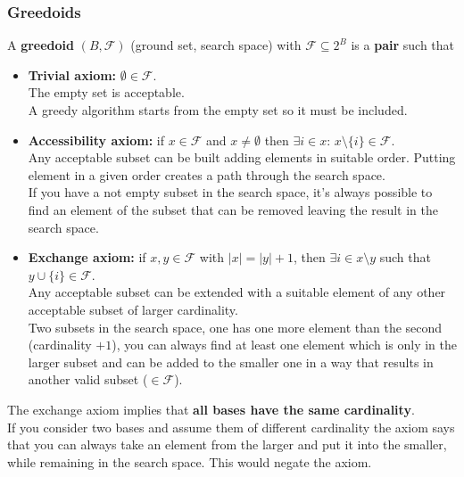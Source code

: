 \subsubsection{Greedoids}
A \textbf{greedoid} $(B, \mathcal{F})$ (ground set, search space) with $\mathcal{F} \subseteq 2^B$ is a \textbf{pair} such that
\begin{itemize}
	\item \textbf{Trivial axiom:} $\emptyset \in \mathcal{F}$.\\
	The empty set is acceptable. \\
	A greedy algorithm starts from the empty set so it must be included.\\
	
	\item \textbf{Accessibility axiom:} if $x \in \mathcal{F}$ and $x \neq \emptyset$ then $\exists i \in x : \, x \setminus \{i\} \in \mathcal{F}$.\\
	Any acceptable subset can be built adding elements in suitable order. Putting element in a given order creates a path through the search space.\\
	If you have a not empty subset in the search space, it's always possible to find an element of the subset that can be removed leaving the result in the search space.\\
	
	\item \textbf{Exchange axiom:} if $x, y \in \mathcal{F}$ with $|x| = |y| + 1$, then $\exists i \in x \setminus y$ such that $y \cup \{i\} \in \mathcal{F}$.\\
	Any acceptable subset can be extended with a suitable element of any other acceptable subset of larger cardinality.\\
	Two subsets in the search space, one has one more element than the second (cardinality $+1$), you can always find at least one element which is only in the larger subset and can be added to the smaller one in a way that results in another valid subset ($\in \mathcal{F}$).\\
\end{itemize}

The exchange axiom implies that \textbf{all bases have the same cardinality}. \\
If you consider two bases and assume them of different cardinality the axiom says that you can always take an element from the larger and put it into the smaller, while remaining in the search space. This would negate the axiom.\\

